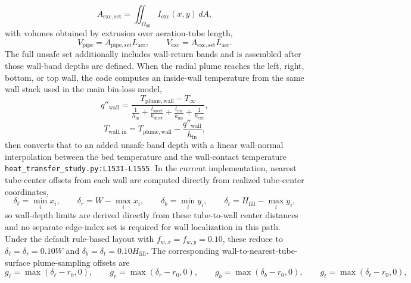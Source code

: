 \documentclass[11pt]{article}
\newcommand{\srcref}[1]{\nolinkurl{#1}}
\begin{document}
\begin{equation}
\label{eq:exclusion_set_area}
A_{\mathrm{exc,set}}=\iint_{\Omega_{\mathrm{fill}}} I_{\mathrm{exc}}(x,y)\,dA,
\end{equation}
with volumes obtained by extrusion over aeration-tube length,
\begin{equation}
\label{eq:pipe_exclusion_volumes}
V_{\mathrm{pipe}}=A_{\mathrm{pipe,set}}L_{\mathrm{aer}},
\qquad
V_{\mathrm{exc}}=A_{\mathrm{exc,set}}L_{\mathrm{aer}}.
\end{equation}
The full unsafe set additionally includes wall-return bands and is assembled after those wall-band depths are defined.
When the radial plume reaches the left, right, bottom, or top wall, the code computes an inside-wall temperature from the same wall stack used in the main bin-loss model,
\begin{equation}
\label{eq:wall_return_flux}
q''_{\mathrm{wall}}=
\frac{T_{\mathrm{plume,wall}}-T_\infty}
{\frac{1}{h_{\mathrm{in}}}+\frac{t_{\mathrm{sheet}}}{k_{\mathrm{sheet}}}+\frac{t_{\mathrm{ins}}}{k_{\mathrm{ins}}}+\frac{1}{h_{\mathrm{ext}}}},
\end{equation}
\begin{equation}
\label{eq:wall_inner_temperature}
T_{\mathrm{wall,in}}=T_{\mathrm{plume,wall}}-\frac{q''_{\mathrm{wall}}}{h_{\mathrm{in}}},
\end{equation}
then converts that to an added unsafe band depth with a linear wall-normal interpolation between the bed temperature and the wall-contact temperature \srcref{heat_transfer_study.py:L1531-L1555}. In the current implementation, nearest tube-center offsets from each wall are computed directly from realized tube-center coordinates,
\begin{equation}
\label{eq:wall_centerline_offsets}
\delta_{\ell}=\min_i x_i,\qquad
\delta_r=W-\max_i x_i,\qquad
\delta_b=\min_i y_i,\qquad
\delta_t=H_{\mathrm{fill}}-\max_i y_i,
\end{equation}
so wall-depth limits are derived directly from these tube-to-wall center distances and no separate edge-index set is required for wall localization in this path. Under the default rule-based layout with \(f_{w,x}=f_{w,y}=0.10\), these reduce to \(\delta_{\ell}=\delta_r=0.10W\) and \(\delta_b=\delta_t=0.10H_{\mathrm{fill}}\). The corresponding wall-to-nearest-tube-surface plume-sampling offsets are
\begin{equation}
\label{eq:wall_profile_sampling_offsets}
g_{\ell}=\max\!\left(\delta_{\ell}-r_0,0\right),\qquad
g_r=\max\!\left(\delta_r-r_0,0\right),\qquad
g_b=\max\!\left(\delta_b-r_0,0\right),\qquad
g_t=\max\!\left(\delta_t-r_0,0\right),
\end{equation}
\end{document}
